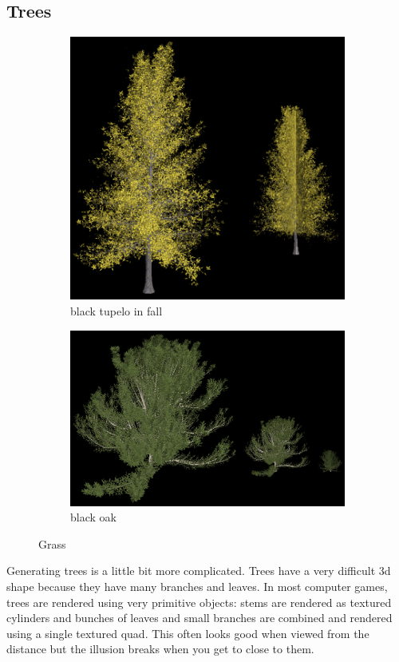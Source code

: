 \documentclass[journal, letterpaper]{IEEEtran}
\begin{document}
\subsection{Trees}
\begin{figure}
	\centering
	\begin{subfigure}[b]{0.45\textwidth}
		\includegraphics[width=\textwidth]{images/Tree1}
		\caption{black tupelo in fall}
		\label{fig:trees1}
	\end{subfigure}
	\begin{subfigure}[b]{0.45\textwidth}
		\includegraphics[width=\textwidth]{images/Tree2}
		\caption{black oak}
		\label{fig:trees2}
	\end{subfigure}
	\caption{Grass}\label{fig:trees}
\end{figure}
Generating trees is a little bit more complicated. Trees have a very difficult 3d shape because they have many branches and leaves. In most computer games, trees are rendered using very primitive objects: stems are rendered as textured cylinders and bunches of leaves and small branches are combined and rendered using a single textured quad. This often looks good when viewed from the distance but the illusion breaks when you get to close to them.
\end{document}
